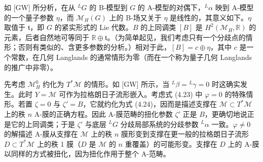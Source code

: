 

如 [GW] 所分析，在从 ${}^LG$ 的 B-模型到 $G$ 的 A-模型的对偶下，${}^L\alpha$ 映到 A-模型的一个量子参数 $\eta$，而 $\mathcal{M}_H(G)$ 上的 B-场又关于 $\eta$ 是线性的，其意义如下。$\eta$ 取值于 $\mathfrak{t}$，即 $G$ 的紧实形式的 Lie 代数。$B$ 的上同调类 $[B]$ 是 $H^2(\mathcal{M}_H,\mathbb{R})$ 的元素，后者自然地可等同于 $\mathbb{R}\oplus\mathfrak{t}$。（为简单起见，我们考虑只有一个分歧点的情形；否则有类似的、含更多参数的分析。）相对于此，$[B]=c\oplus\eta$，其中 $c$ 是一个常数，在几何 Langlands 的通常情形为零（而在一个称为量子几何 Langlands 的推广中非零）。


先考虑 $\mathcal{M}_H^0$ 约化为 $T^*\mathcal{M}$ 的情形。如 [GW] 所示，当 ${}^L\beta={}^L\gamma=0$ 时这确实发生。此时 $Y=\mathcal{M}$ 可作为拉格朗日子流形嵌入。考虑式 (4.23) 中 $\varphi=0$ 的特殊情形。若置 $\zeta=0$ 与 $\zeta'=B$，它就约化为式 (4.24)，因而是描述支撑在 $\mathcal{M}\subset T^*\mathcal{M}$ 上的秩 $n$ A-膜的正确方程。因此 A-膜范畴的扭化参数 $\zeta'$ 正是 $B$，更确切地说正是它的上同调类；于是 $\zeta'$ 与底层 ${}^LG$ 分歧局部系统的分歧参数 ${}^L\alpha$ 一致。$\varphi\neq0$ 的解描述 A-膜从支撑在 $\mathcal{M}$ 上的秩 $n$ 膜形变到支撑在更一般的拉格朗日子流形 $D\subset T^*\mathcal{M}$ 上的秩 1 膜（$D$ 是 $\mathcal{M}$ 的 $n$ 重覆盖）的可能形变。支撑在 $D$ 上的 A-膜以同样的方式被扭化，因为扭化作用于整个 A-范畴。


